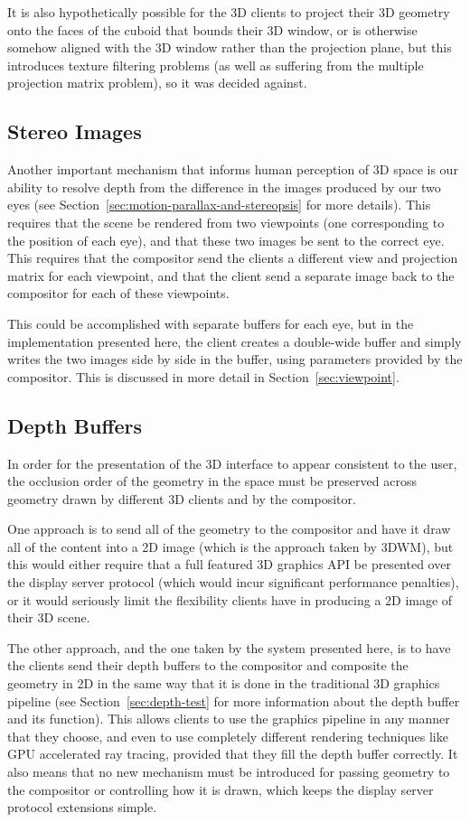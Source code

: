 It is also hypothetically possible for the 3D clients to project their 3D geometry onto the faces of the cuboid that bounds their 3D window, or is otherwise somehow aligned with the 3D window rather than the projection plane, but this introduces texture filtering problems (as well as suffering from the multiple projection matrix problem), so it was decided against.

\subsection{Stereo Images}
Another important mechanism that informs human perception of 3D space is our ability to resolve depth from the difference in the images produced by our two eyes (see Section~\ref{sec:motion-parallax-and-stereopsis} for more details). This requires that the scene be rendered from two viewpoints (one corresponding to the position of each eye), and that these two images be sent to the correct eye. This requires that the compositor send the clients a different view and projection matrix for each viewpoint, and that the client send a separate image back to the compositor for each of these viewpoints. 

This could be accomplished with separate buffers for each eye, but in the implementation presented here, the client creates a double-wide buffer and simply writes the two images side by side in the buffer, using parameters provided by the compositor. This is discussed in more detail in Section~\ref{sec:viewpoint}.

\subsection{Depth Buffers}
\label{sec:depth-compositing}

In order for the presentation of the 3D interface to appear consistent to the user, the occlusion order of the geometry in the space must be preserved across geometry drawn by different 3D clients and by the compositor. 

One approach is to send all of the geometry to the compositor and have it draw all of the content into a 2D image (which is the approach taken by 3DWM), but this would either require that a full featured 3D graphics API be presented over the display server protocol (which would incur significant performance penalties), or it would seriously limit the flexibility clients have in producing a 2D image of their 3D scene.

The other approach, and the one taken by the system presented here, is to have the clients send their depth buffers to the compositor and composite the geometry in 2D in the same way that it is done in the traditional 3D graphics pipeline (see Section~\ref{sec:depth-test} for more information about the depth buffer and its function). This allows clients to use the graphics pipeline in any manner that they choose, and even to use completely different rendering techniques like GPU accelerated ray tracing, provided that they fill the depth buffer correctly. It also means that no new mechanism must be introduced for passing geometry to the compositor or controlling how it is drawn, which keeps the display server protocol extensions simple.


